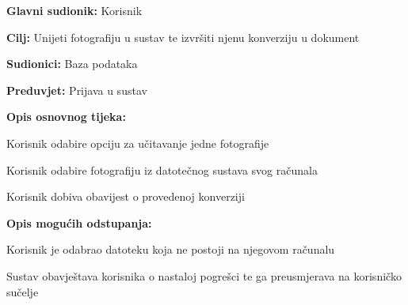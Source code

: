				
				\noindent {}
				\begin{packed_item}
					
					\item \textbf{Glavni sudionik: }Korisnik
					\item  \textbf{Cilj:} Unijeti fotografiju u sustav te izvršiti njenu konverziju u dokument
					\item  \textbf{Sudionici:} Baza podataka
					\item  \textbf{Preduvjet:} Prijava u sustav
					\item  \textbf{Opis osnovnog tijeka:}
					
					\item[] \begin{packed_enum}
						
						\item Korisnik odabire opciju za učitavanje jedne fotografije
						\item Korisnik odabire fotografiju iz datotečnog sustava svog računala
						\item Korisnik dobiva obavijest o provedenoj konverziji
						
					\end{packed_enum}
					
					\item  \textbf{Opis mogućih odstupanja:}
					
					\item[] \begin{packed_item}
						
						\item[2.a] Korisnik je odabrao datoteku koja ne postoji na njegovom računalu
						\item[] \begin{packed_enum}
							
							\item Sustav obavještava korisnika o nastaloj pogrešci te ga preusmjerava na korisničko sučelje
							
						\end{packed_enum}
					\end{packed_item}
				\end{packed_item}
				
